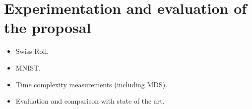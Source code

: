 \section{Experimentation and evaluation of the proposal}

\begin{itemize}
    \item Swiss Roll.
    \item MNIST.
    \item Time complexity measurements (including MDS).
    \item Evaluation and comparison with state of the art.
\end{itemize}